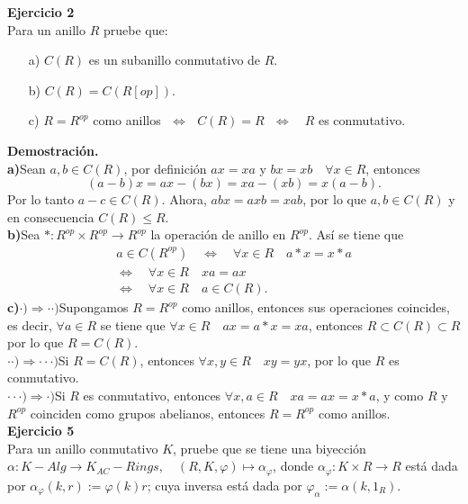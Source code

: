 \documentclass{article}
\theoremstyle{definition}
\theoremstyle{plain}
\theoremstyle{plain}
\theoremstyle{definition}
\theoremstyle{definition}
\theoremstyle{definition}
\theoremstyle{definition}
\theoremstyle{definition}
\theoremstyle{definition}
\begin{document}
\textbf{Ejercicio 2} \\
Para un anillo $R$ pruebe que: 
\begin{itemize}
\item[a)] $C(R)$ es un subanillo conmutativo de $R$.
\item[b)] $C(R)=C(R[{op}])$.
\item[c)] $R=R^{op}$ como anillos\,\, $\Leftrightarrow$ \,\,$C(R)=R$\,\, $\Leftrightarrow$ \,\, $R$ es conmutativo.
\end{itemize}

\textbf{Demostración.}\\
\textbf{a)}\quad Sean $a,b\in C(R)$, por definición $ax=xa$ y $bx=xb\quad\forall x\in R$, entonces
\[(a-b)x=ax-(bx)=xa-(xb)=x(a-b).\]
Por lo tanto $a-c\in C(R)$. Ahora, $abx=axb=xab$, por lo que $a,b\in C(R)$ y en consecuencia $C(R)\leq R$.\\

\textbf{b)}\quad Sea $*:R^{op}\times R^{op}\to R^{op}$ la operación de anillo en $R^{op}$. Así se tiene que 
\begin{gather*}
a\in C(R^{op})\quad \Leftrightarrow\quad  \forall x\in R\quad a*x=x*a
\\ \Leftrightarrow\quad \forall x\in R\quad xa=ax\\
\Leftrightarrow\quad \forall x\in R\quad a\in C(R).
\end{gather*}
\textbf{c)}\quad $\cdot)\Rightarrow \cdot\cdot)$\quad Supongamos $R=R^{op}$ como anillos, entonces sus operaciones coincides, es decir,
$\forall a\in R$ se tiene que $\forall x\in R\quad ax=a*x=xa$, entonces $R\subset C(R)\subset R$ por lo que $R=C(R)$.\\
 
$\cdot\cdot)\Rightarrow \cdot\cdot\cdot)$\quad Si $R=C(R)$, entonces $\forall x,y\in R\quad xy=yx$, por lo que $R$ es conmutativo.\\
  
$\cdot\cdot\cdot)\Rightarrow \cdot)$\quad Si $R$ es conmutativo, entonces $\forall x,a\in R\quad xa=ax=x*a$, y como $R$ y $R^{op}$ 
coinciden como grupos abelianos, entonces $R=R^{op}$ como anillos.\\

\textbf{Ejercicio 5} \\

Para un anillo conmutativo $K$, pruebe que se tiene una biyección \\
$\alpha:K-Alg\longrightarrow K_{AC}-Rings,\quad  (R,K,\varphi)\longmapsto \alpha_{\varphi}$, donde 
$\alpha_\varphi:K\times R\to R$ está dada por $\alpha_\varphi(k,r):=\varphi(k)r$; cuya inversa está dada por
 $\varphi_\alpha:=\alpha(k,1_R).$\\
 
\end{document}
